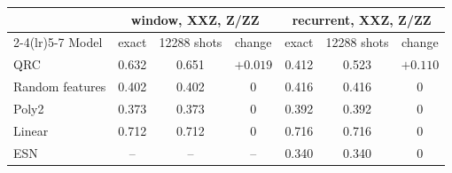 \begin{tabular}{lcccccc}
\toprule
 & \multicolumn{3}{c}{window, XXZ, Z/ZZ} & \multicolumn{3}{c}{recurrent, XXZ, Z/ZZ} \\
\cmidrule(lr){2-4}\cmidrule(lr){5-7}
Model & exact & 12288 shots & change & exact & 12288 shots & change \\
\midrule
QRC & 0.632 & 0.651 & $+0.019$ & 0.412 & 0.523 & $+0.110$ \\
Random features & 0.402 & 0.402 & $0$ & 0.416 & 0.416 & $0$ \\
Poly2 & 0.373 & 0.373 & $0$ & 0.392 & 0.392 & $0$ \\
Linear & 0.712 & 0.712 & $0$ & 0.716 & 0.716 & $0$ \\
ESN & -- & -- & -- & 0.340 & 0.340 & $0$ \\
\bottomrule
\end{tabular}
